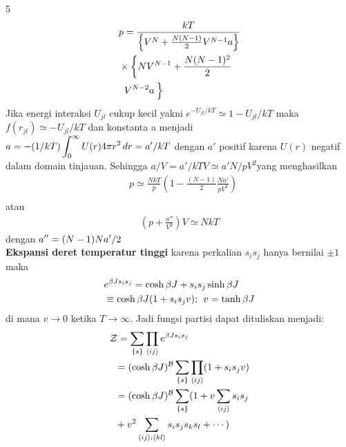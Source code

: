 \documentclass[a4paper  , 6 pt]{article}
\begin{document}
\begin{tiny}
\begin{multicols} {5}
 \begin{align}
  & p = \frac{kT }{\left \{ V^N + \frac{N (N - 1)}{2} V^{N - 1} a  \right \}} \nonumber \\
  &\times \left \{ N V^{N - 1}  + \frac{N (N - 1)^2}{2}  \right. \nonumber \\
  & \hspace{0.1 cm} \left. V^{N - 2} a \frac{}{} \right \}  
 \end{align}
 Jika energi interaksi $U_{jl}$  cukup kecil yakni $e^{- U_{jl }/ kT}\simeq 1 - U_{jl} /kT $ maka $ f(r_{jl })  \simeq - U_{jl }/kT$ dan konstanta a  menjadi  $\displaystyle a = - (1/ kT) \int_{0}^{\infty} U (r)  4 \pi r^2 \, dr  = a' /k T $ dengan $a'$ positif karena $U(r)$ negatif dalam domain tinjauan. Sehingga $a/ V = a' /kTV \simeq a' N/ pV^2 $yang menghasilkan 
 \begin{align}
 & p \simeq  \frac{Nk T}{p} \left ( 1 - \frac{(N - 1)}{2} \frac{N a' }{p V^2} \right ) \nonumber \\
 \end{align}
 atau 
 \begin{align}
 \left( p + \frac{a''}{V^2}  \right) V \simeq  Nk T
 \end{align}
 dengan $\displaystyle a'' = (N - 1) N a' /2 $ \\
 \textbf{Ekspansi deret temperatur tinggi}
 karena perkalian $s_i s_j$ hanya bernilai $\pm 1$ maka 
 \begin{align}
 & e^{\beta J s_i s_j}  = \cosh \beta J  + s_i s_j  \sinh \beta J \nonumber \\
 & \equiv \cosh \beta J ( 1 + s_i s_j v) \text{; } \hspace{0.1 cm} v = \tanh \beta J
 \end{align}
 di mana $ v \rightarrow 0 $ ketika $T \rightarrow \infty$. Jadi fungsi partisi dapat dituliskan menjadi:
 \newcommand{\sumof}{\sum_{\{s\}}}
 \newcommand{\prodij}{\prod_{\langle ij \rangle }} 
 \newcommand{\spasi}{& \hspace{ 0.2 cm}} 
 \newcommand{\pindah}{\nonumber \\}
\begin{align}
 & \mathcal{Z}  = \sumof \prodij e^{\beta  J s_i s_j }\nonumber \\
 & \hspace{0.2 cm} = (\cosh  \beta J )^{
 \mathcal{B}} \sumof \prodij  ( 1 +  s_i s_jv) \pindah 
 \spasi =  (\cosh \beta J )^\mathcal{B} \sumof (1 + v \sum_{\langle ij \rangle }  s_i s_j \pindah  
 \spasi + v^2 \sum_{\langle ij \rangle ; \langle kl \rangle } s_i s_j s_k s_l + \cdots ) 

\end{align}
\end{multicols}
\end{tiny}
\end{document}
